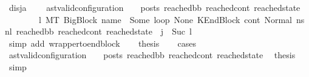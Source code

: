 \begin{isabellebody}
\ disj{\isacharunderscore}{\kern0pt}a{\isacharcolon}{\kern0pt}\isanewline
\ \ \ \ {\isachardoublequoteopen}{\isacharparenleft}{\kern0pt}ast{\isacharunderscore}{\kern0pt}valid{\isacharunderscore}{\kern0pt}configuration\ {\isasymLambda}\ {\isasymGamma}\ {\isasymOmega}\ posts\ reached{\isacharunderscore}{\kern0pt}bb\ reached{\isacharunderscore}{\kern0pt}cont\ reached{\isacharunderscore}{\kern0pt}state{\isacharparenright}{\kern0pt}\ {\isasymor}\ \isanewline
\ \ \ \ \ \ \ {\isacharparenleft}{\kern0pt}{\isasymexists}\ l{}{\isachardot}{\kern0pt}\ {\isacharparenleft}{\kern0pt}M{\isacharcomma}{\kern0pt}{\isasymLambda}{\isacharcomma}{\kern0pt}{\isasymGamma}{\isacharcomma}{\kern0pt}{\isasymOmega}{\isacharcomma}{\kern0pt}T\ {\isasymturnstile}{\isacharparenleft}{\kern0pt}BigBlock\ name\ {\isacharbrackleft}{\kern0pt}{\isacharbrackright}{\kern0pt}\ {\isacharparenleft}{\kern0pt}Some\ loop{\isacharparenright}{\kern0pt}\ None{\isacharcomma}{\kern0pt}\ KEndBlock\ cont{}{\isacharcomma}{\kern0pt}\ Normal\ ns{}{\isacharprime}{\kern0pt}{\isacharprime}{\kern0pt}{\isacharparenright}{\kern0pt}\ {\isacharminus}{\kern0pt}n{\isasymlongrightarrow}{\isacharcircum}{\kern0pt}l{}\ {\isacharparenleft}{\kern0pt}reached{\isacharunderscore}{\kern0pt}bb{\isacharcomma}{\kern0pt}\ reached{\isacharunderscore}{\kern0pt}cont{\isacharcomma}{\kern0pt}\ reached{\isacharunderscore}{\kern0pt}state{\isacharparenright}{\kern0pt}{\isacharparenright}{\kern0pt}\ {\isasymand}\ {\isacharparenleft}{\kern0pt}j\ {\isacharequal}{\kern0pt}\ Suc\ l{}{\isacharparenright}{\kern0pt}\ {\isacharparenright}{\kern0pt}{\isachardoublequoteclose}\ \isanewline
\ \ \ \ \isamarkupfalse%
\ {\isacharparenleft}{\kern0pt}simp\ add{\isacharcolon}{\kern0pt}\ wrapper{\isacharunderscore}{\kern0pt}to{\isacharunderscore}{\kern0pt}endblock{\isacharparenright}{\kern0pt}\isanewline
\ \ \isamarkupfalse%
\ {\isacharquery}{\kern0pt}thesis\isanewline
\ \ \isamarkupfalse%
\ cases\isanewline
\ \ \ \ \isamarkupfalse%
\ {\isachardoublequoteopen}{\isacharparenleft}{\kern0pt}ast{\isacharunderscore}{\kern0pt}valid{\isacharunderscore}{\kern0pt}configuration\ {\isasymLambda}\ {\isasymGamma}\ {\isasymOmega}\ posts\ reached{\isacharunderscore}{\kern0pt}bb\ reached{\isacharunderscore}{\kern0pt}cont\ reached{\isacharunderscore}{\kern0pt}state{\isacharparenright}{\kern0pt}{\isachardoublequoteclose}\ \isamarkupfalse%
\ {\isacharquery}{\kern0pt}thesis\ \isamarkupfalse%
\ simp\isanewline

\end{isabellebody}

